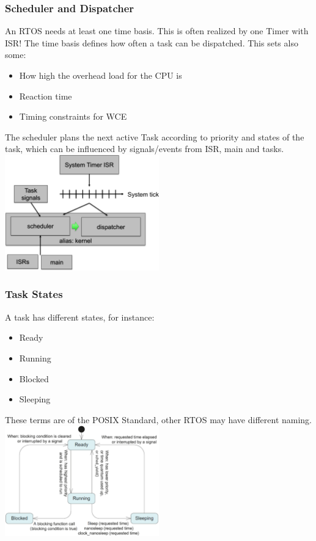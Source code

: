 \subsubsection{Scheduler and Dispatcher}
An RTOS needs at least one time basis.
This is often realized by one Timer with ISR!
The time basis defines how often a task can be dispatched.
This sets also some:
\begin{itemize}
    \item How high the overhead load for the CPU is
    \item Reaction time
    \item Timing constraints for WCE
\end{itemize}
The scheduler plans the next active Task according to priority and states of the task, which can be influenced by signals/events from ISR, main and tasks.\\
\includegraphics[width=0.5\textwidth]{images/RTOS/scheduler_dispatcher.png}

\subsubsection{Task States}
A task has different states, for instance:
\begin{itemize}
    \item Ready
    \item Running
    \item Blocked
    \item Sleeping
\end{itemize}
These terms are of the POSIX Standard, other RTOS may have different naming.\\
\includegraphics[width=0.5\textwidth]{images/RTOS/task_states_posix.png}
